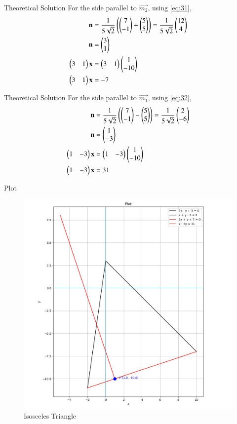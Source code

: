 \documentclass{beamer}
\begin{document}
\begin{frame}{Theoretical Solution}
For the side parallel to $\vec{m_2}$, using \eqref{eq:31},
\begin{align}
    \mathbf{n} &= \frac{1}{5\sqrt{2}}\left(\begin{pmatrix}7 \\ -1\end{pmatrix} + \begin{pmatrix}5 \\ 5\end{pmatrix}\right) = \frac{1}{5\sqrt{2}}\begin{pmatrix}12 \\ 4\end{pmatrix} \\
    \mathbf{n} &= \begin{pmatrix}3 \\ 1\end{pmatrix} \\
    \begin{pmatrix}3 & 1\end{pmatrix}\mathbf{x} &= \begin{pmatrix}3 & 1\end{pmatrix}\begin{pmatrix}1 \\ -10\end{pmatrix} \\
	\begin{pmatrix}3 & 1\end{pmatrix}\mathbf{x} &= -7
\end{align}
\end{frame}

\begin{frame}{Theoretical Solution}
For the side parallel to $\vec{m_1}$, using \eqref{eq:32},
\begin{align}    
    \mathbf{n} &= \frac{1}{5\sqrt{2}}\left(\begin{pmatrix}7 \\ -1\end{pmatrix} - \begin{pmatrix}5 \\ 5\end{pmatrix}\right) = \frac{1}{5\sqrt{2}}\begin{pmatrix}2 \\ -6\end{pmatrix} \\
    \mathbf{n} &= \begin{pmatrix}1 \\ -3\end{pmatrix} \\
	\begin{pmatrix}1 & -3\end{pmatrix}\mathbf{x} &= \begin{pmatrix}1 & -3\end{pmatrix}\begin{pmatrix}1 \\ -10\end{pmatrix} \\
    \begin{pmatrix}1 & -3\end{pmatrix}\mathbf{x} &= 31
\end{align}
\end{frame}

\begin{frame}{Plot}
    \begin{figure}
        \centering
        \includegraphics[width=0.5\columnwidth]{../figs/plot_c.jpg}
        \caption{Isosceles Triangle}
        \label{fig:fig}
    \end{figure}
\end{frame}
\end{document}
